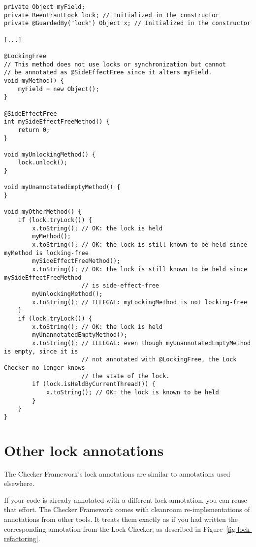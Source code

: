 \begin{verbatim}
private Object myField;
private ReentrantLock lock; // Initialized in the constructor
private @GuardedBy("lock") Object x; // Initialized in the constructor

[...]

@LockingFree
// This method does not use locks or synchronization but cannot
// be annotated as @SideEffectFree since it alters myField.
void myMethod() {
    myField = new Object();
}

@SideEffectFree
int mySideEffectFreeMethod() {
    return 0;
}

void myUnlockingMethod() {
    lock.unlock();
}

void myUnannotatedEmptyMethod() {
}

void myOtherMethod() {
    if (lock.tryLock()) {
        x.toString(); // OK: the lock is held
        myMethod();
        x.toString(); // OK: the lock is still known to be held since myMethod is locking-free
        mySideEffectFreeMethod();
        x.toString(); // OK: the lock is still known to be held since mySideEffectFreeMethod
                      // is side-effect-free
        myUnlockingMethod();
        x.toString(); // ILLEGAL: myLockingMethod is not locking-free
    }
    if (lock.tryLock()) {
        x.toString(); // OK: the lock is held
        myUnannotatedEmptyMethod();
        x.toString(); // ILLEGAL: even though myUnannotatedEmptyMethod is empty, since it is
                      // not annotated with @LockingFree, the Lock Checker no longer knows
                      // the state of the lock.
        if (lock.isHeldByCurrentThread()) {
            x.toString(); // OK: the lock is known to be held
        }
    }
}
\end{verbatim}

\section{Other lock annotations\label{other-lock-annotations}}

The Checker Framework's lock annotations are similar to annotations used
elsewhere.

If your code is already annotated with a different lock
annotation, you can reuse that effort.  The Checker Framework comes with
cleanroom re-implementations of annotations from other tools.  It treats
them exactly as if you had written the corresponding annotation from the
Lock Checker, as described in Figure~\ref{fig-lock-refactoring}.


